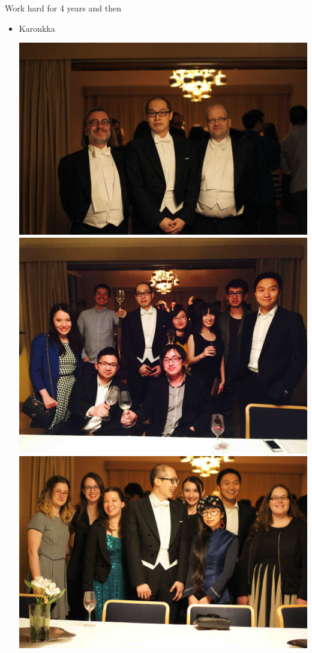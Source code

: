 \documentclass[first=dgreen,second=purple,logo=yellowexc]{aaltoslides}
\begin{document}
\begin{frame}{Work hard for 4 years and then}
\begin{itemize}
\begin{center}
		\end{center}
		\item Karonkka
		\begin{center}
			\includegraphics[scale=0.02,angle=0]{./plots/kk1.jpg}			
			\includegraphics[scale=0.023,angle=0]{./plots/kk2.jpg}
			\includegraphics[scale=0.02,angle=0]{./plots/kk3.jpg}

\end{center}
\end{itemize}
\end{frame}
\end{document}
